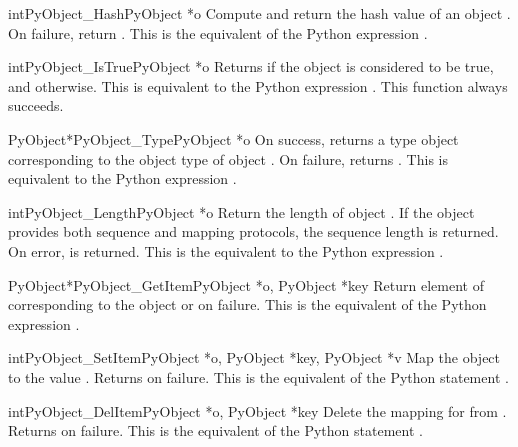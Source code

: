 \documentclass{manual}
\begin{document}
\begin{cfuncdesc}{int}{PyObject_Hash}{PyObject *o}
Compute and return the hash value of an object .  On
failure, return .  This is the equivalent of the Python
expression .
\end{cfuncdesc}


\begin{cfuncdesc}{int}{PyObject_IsTrue}{PyObject *o}
Returns  if the object  is considered to be true, and
 otherwise. This is equivalent to the Python expression
.
This function always succeeds.
\end{cfuncdesc}


\begin{cfuncdesc}{PyObject*}{PyObject_Type}{PyObject *o}
On success, returns a type object corresponding to the object
type of object . On failure, returns \NULL{}.  This is
equivalent to the Python expression .
\end{cfuncdesc}

\begin{cfuncdesc}{int}{PyObject_Length}{PyObject *o}
Return the length of object .  If the object  provides
both sequence and mapping protocols, the sequence length is
returned.  On error,  is returned.  This is the equivalent
to the Python expression .
\end{cfuncdesc}


\begin{cfuncdesc}{PyObject*}{PyObject_GetItem}{PyObject *o, PyObject *key}
Return element of  corresponding to the object  or
\NULL{} on failure. This is the equivalent of the Python expression
.
\end{cfuncdesc}


\begin{cfuncdesc}{int}{PyObject_SetItem}{PyObject *o, PyObject *key, PyObject *v}
Map the object  to the value .
Returns  on failure.  This is the equivalent
of the Python statement .
\end{cfuncdesc}


\begin{cfuncdesc}{int}{PyObject_DelItem}{PyObject *o, PyObject *key}
Delete the mapping for  from .  Returns  on
failure. This is the equivalent of the Python statement .
\end{cfuncdesc}
\end{document}
